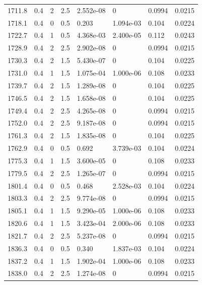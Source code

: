 \documentclass[preview]{standalone}
\begin{document}
{{{{{{\begin{tabular}{L{1.2cm}C{1.2cm} C{0.3cm}C{0.5cm} C{1.4cm}C{1.4cm} C{1.4cm}C{1.4cm}}
  1711.8  &   0.4  & 2     & 2.5 &  2.552e-08  & 0  & 0.0994 &  0.0215   \\ 
  1718.1  &   0.4  & 0     & 0.5 &  0.203  & 1.094e-03  & 0.104 &  0.0224   \\ 
  1722.7  &   0.4  & 1     & 0.5 &  4.368e-03  & 2.400e-05  & 0.112 &  0.0243   \\ 
  1728.9  &   0.4  & 2     & 2.5 &  2.902e-08  & 0  & 0.0994 &  0.0215   \\ 
  1730.3  &   0.4  & 2     & 1.5 &  5.430e-07  & 0  & 0.104 &  0.0225   \\ 
  1731.0  &   0.4  & 1     & 1.5 &  1.075e-04  & 1.000e-06  & 0.108 &  0.0233   \\ 
  1739.7  &   0.4  & 2     & 1.5 &  1.289e-08  & 0  & 0.104 &  0.0225   \\ 
  1746.5  &   0.4  & 2     & 1.5 &  1.658e-08  & 0  & 0.104 &  0.0225   \\ 
  1749.4  &   0.4  & 2     & 2.5 &  4.265e-08  & 0  & 0.0994 &  0.0215   \\ 
  1752.0  &   0.4  & 2     & 2.5 &  9.187e-08  & 0  & 0.0994 &  0.0215   \\ 
  1761.3  &   0.4  & 2     & 1.5 &  1.835e-08  & 0  & 0.104 &  0.0225   \\ 
  1762.9  &   0.4  & 0     & 0.5 &  0.692  & 3.739e-03  & 0.104 &  0.0224   \\ 
  1775.3  &   0.4  & 1     & 1.5 &  3.600e-05  & 0  & 0.108 &  0.0233   \\ 
  1779.5  &   0.4  & 2     & 2.5 &  1.265e-07  & 0  & 0.0994 &  0.0215   \\ 
  1801.4  &   0.4  & 0     & 0.5 &  0.468  & 2.528e-03  & 0.104 &  0.0224   \\ 
  1803.3  &   0.4  & 2     & 2.5 &  9.774e-08  & 0  & 0.0994 &  0.0215   \\ 
  1805.1  &   0.4  & 1     & 1.5 &  9.290e-05  & 1.000e-06  & 0.108 &  0.0233   \\ 
  1820.6  &   0.4  & 1     & 1.5 &  3.423e-04  & 2.000e-06  & 0.108 &  0.0233   \\ 
  1821.7  &   0.4  & 2     & 2.5 &  5.237e-08  & 0  & 0.0994 &  0.0215   \\ 
  1836.3  &   0.4  & 0     & 0.5 &  0.340  & 1.837e-03  & 0.104 &  0.0224   \\ 
  1837.2  &   0.4  & 1     & 1.5 &  1.902e-04  & 1.000e-06  & 0.108 &  0.0233   \\ 
  1838.0  &   0.4  & 2     & 2.5 &  1.274e-08  & 0  & 0.0994 &  0.0215   \\ 

\end{tabular}}}}}}}
\end{document}
